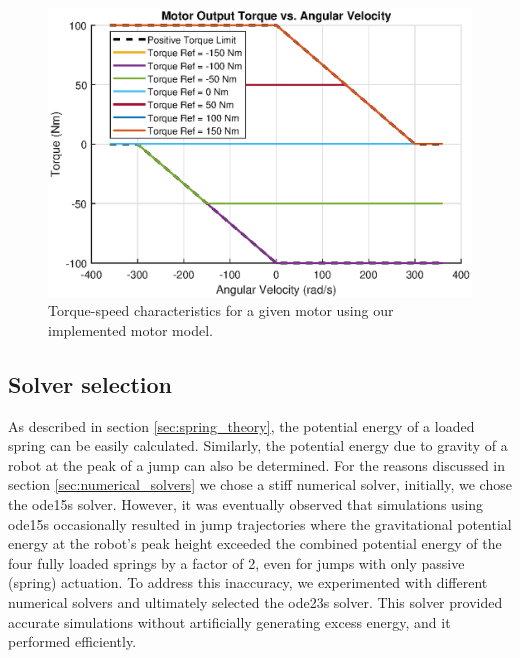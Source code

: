 \begin{figure}
    \centering
    \includegraphics[width=\textwidth]{Images/torque_speed_func.eps}
    \caption{Torque-speed characteristics for a given motor using our implemented motor model.}
    \label{fig:torque_speed_func}
\end{figure}

\subsection{Solver selection}

As described in section \ref{sec:spring_theory}, the potential energy of a loaded spring can be easily calculated. Similarly, the potential energy due to gravity of a robot at the peak of a jump can also be determined. For the reasons discussed in section \ref{sec:numerical_solvers} we chose a stiff numerical solver, initially, we chose the ode15s solver. However, it was eventually observed that simulations using ode15s occasionally resulted in jump trajectories where the gravitational potential energy at the robot's peak height exceeded the combined potential energy of the four fully loaded springs by a factor of 2, even for jumps with only passive (spring) actuation. To address this inaccuracy, we experimented with different numerical solvers and ultimately selected the ode23s solver. This solver provided accurate simulations without artificially generating excess energy, and it performed efficiently.


